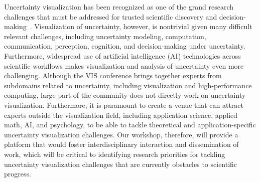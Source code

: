 \maketitle

\vspace{-1mm}

Uncertainty visualization has been recognized as one of the grand research challenges that must be addressed for trusted scientific discovery and decision-making~\cite{TA:2004:Johnson:topScivis,TA:Johnson:2003:nextStepVisErrors}. Visualization of uncertainty, however, is nontrivial given many difficult relevant challenges, including uncertainty modeling, computation, communication, perception, cognition, and decision-making under uncertainty. Furthermore, widespread use of artificial intelligence (AI) technologies across scientific workflows makes visualization and analysis of uncertainty even more challenging. Although the VIS conference brings together experts from subdomains related to uncertainty, including visualization and high-performance computing, large part of the community does not directly work on uncertainty visualization. Furthermore, it is paramount to create a venue that can attract experts outside the visualization field, including application science, applied math, AI, and psychology, to be able to tackle theoretical and application-specific uncertainty visualization challenges. Our workshop, therefore, will provide a platform that would foster interdisciplinary interaction and dissemination of work, which will be critical to identifying research priorities for tackling uncertainty visualization challenges that are currently obstacles to scientific progress. 





